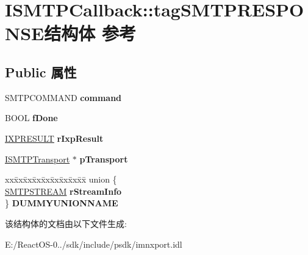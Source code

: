 \hypertarget{struct_i_s_m_t_p_callback_1_1tag_s_m_t_p_r_e_s_p_o_n_s_e}{}\section{I\+S\+M\+T\+P\+Callback\+:\+:tag\+S\+M\+T\+P\+R\+E\+S\+P\+O\+N\+S\+E结构体 参考}
\label{struct_i_s_m_t_p_callback_1_1tag_s_m_t_p_r_e_s_p_o_n_s_e}
\subsection*{Public 属性}
\begin{DoxyCompactItemize}
\item 
\mbox{\label{struct_i_s_m_t_p_callback_1_1tag_s_m_t_p_r_e_s_p_o_n_s_e_aa65e2646453f1ad1c7fc9576df1808cb}} 
S\+M\+T\+P\+C\+O\+M\+M\+A\+ND {\bfseries command}
\item 
\mbox{\label{struct_i_s_m_t_p_callback_1_1tag_s_m_t_p_r_e_s_p_o_n_s_e_a5b02f2bfdad30177e54ed2a6a714734e}} 
B\+O\+OL {\bfseries f\+Done}
\item 
\mbox{\label{struct_i_s_m_t_p_callback_1_1tag_s_m_t_p_r_e_s_p_o_n_s_e_ad01f7a7dbbf9155f5c317fa817957ca3}} 
\hyperlink{struct_i_transport_callback_1_1tag_i_x_p_r_e_s_u_l_t}{I\+X\+P\+R\+E\+S\+U\+LT} {\bfseries r\+Ixp\+Result}
\item 
\mbox{\label{struct_i_s_m_t_p_callback_1_1tag_s_m_t_p_r_e_s_p_o_n_s_e_ac4281f7bb16f19f01ff3e5e905085528}} 
\hyperlink{interface_i_s_m_t_p_transport}{I\+S\+M\+T\+P\+Transport} $\ast$ {\bfseries p\+Transport}
\item 
\mbox{\label{struct_i_s_m_t_p_callback_1_1tag_s_m_t_p_r_e_s_p_o_n_s_e_a37e2d941a574641c54a6550a586edeb6}} 
\begin{tabbing}
xx\=xx\=xx\=xx\=xx\=xx\=xx\=xx\=xx\=\kill
union \{\\
\>\hyperlink{struct_i_s_m_t_p_callback_1_1tag_s_m_t_p_s_t_r_e_a_m}{SMTPSTREAM} {\bfseries rStreamInfo}\\
\} {\bfseries DUMMYUNIONNAME}\\

\end{tabbing}\end{DoxyCompactItemize}


该结构体的文档由以下文件生成\+:\begin{DoxyCompactItemize}
\item 
E\+:/\+React\+O\+S-\/0../sdk/include/psdk/imnxport.\+idl\end{DoxyCompactItemize}
